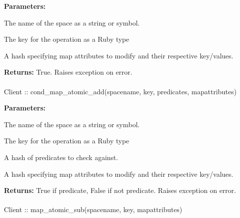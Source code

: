\noindent\textbf{Parameters:}
\begin{description}[labelindent=\widthof{{\code{mapattributes}}},leftmargin=*,noitemsep,nolistsep,align=right]
\item[\code{spacename}] The name of the space as a string or symbol.
\item[\code{key}] The key for the operation as a Ruby type
\item[\code{mapattributes}] A hash specifying map attributes to modify and their respective key/values.
\end{description}

\noindent\textbf{Returns:}
True.  Raises exception on error.

\paragraph{}
\label{api:ruby:cond_map_atomic_add}
\begin{ccode}
Client :: cond_map_atomic_add(spacename, key, predicates, mapattributes)
\end{ccode}
\funcdesc 

\noindent\textbf{Parameters:}
\begin{description}[labelindent=\widthof{{\code{mapattributes}}},leftmargin=*,noitemsep,nolistsep,align=right]
\item[\code{spacename}] The name of the space as a string or symbol.
\item[\code{key}] The key for the operation as a Ruby type
\item[\code{predicates}] A hash of predicates to check against.
\item[\code{mapattributes}] A hash specifying map attributes to modify and their respective key/values.
\end{description}

\noindent\textbf{Returns:}
True if predicate, False if not predicate.  Raises exception on error.

\paragraph{}
\label{api:ruby:map_atomic_sub}
\begin{ccode}
Client :: map_atomic_sub(spacename, key, mapattributes)
\end{ccode}
\funcdesc 

